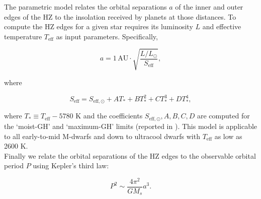 The parametric model \citep{kopparapu13} relates the orbital separations 
$a$ of the inner and outer edges of the HZ to the insolation received by planets 
at those distances. To compute the HZ edges for a given star requires its 
luminosity $L$ and effective temperature $T_{\mathrm{eff}}$ 
as input parameters. Specifically,

\begin{equation}
a = 1 \mathrm{\hspace{2pt} AU} \cdot \sqrt{\frac{L/L_{\odot}}{S_{\mathrm{eff}}}},
\end{equation}

\noindent where

\begin{equation}
S_{\mathrm{eff}} = S_{\mathrm{eff},\odot} + AT_* + BT_*^2 + CT_*^3 + DT_*^4,
\end{equation}

\noindent where $T_* \equiv T_{\mathrm{eff}}-5780$ K and the coefficients 
$S_{\mathrm{eff},\odot},A,B,C,D$ are computed for the `moist-GH' and `maximum-GH' 
limits (reported in \cite{kopparapu13}). This model is applicable to all 
early-to-mid M-dwarfs and down to ultracool dwarfs with $T_{\mathrm{eff}}$ as 
low as 2600 K. \\

Finally we relate the orbital separations of the HZ edges to the observable 
orbital period $P$ using Kepler's third law:

\begin{equation}
P^2 \sim \frac{4 \pi^2}{G M_s} a^3.
\label{eq:keplersthird}
\end{equation}
\fi

